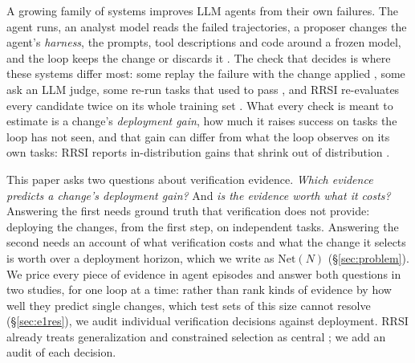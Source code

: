 \documentclass[11pt]{article}
\begin{document}
A growing family of systems improves LLM agents from their own failures. The agent runs, an analyst model reads the failed trajectories, a proposer changes the agent's \emph{harness}, the prompts, tool descriptions and code around a frozen model, and the loop keeps the change or discards it \citep{shinn2023reflexion,zhao2024expel,hu2025adas,zhang2025dgm,agrawal2025gepa,chen2026harnessfix,zhang2026ace,rrsi2026}. The check that decides is where these systems differ most: some replay the failure with the change applied \citep{ma2025dover,lin2026reflect,shah2026car}, some ask an LLM judge, some re-run tasks that used to pass \citep{chen2026harnessfix}, and RRSI re-evaluates every candidate twice on its whole training set \citep{rrsi2026}. What every check is meant to estimate is a change's \emph{deployment gain}, how much it raises success on tasks the loop has not seen, and that gain can differ from what the loop observes on its own tasks: RRSI reports in-distribution gains that shrink out of distribution \citep{rrsi2026}.

This paper asks two questions about verification evidence. \emph{Which evidence predicts a change's deployment gain?} And \emph{is the evidence worth what it costs?} Answering the first needs ground truth that verification does not provide: deploying the changes, from the first step, on independent tasks. Answering the second needs an account of what verification costs and what the change it selects is worth over a deployment horizon, which we write as $\mathrm{Net}(N)$ (\S\ref{sec:problem}). We price every piece of evidence in agent episodes and answer both questions in two studies, for one loop at a time: rather than rank kinds of evidence by how well they predict single changes, which test sets of this size cannot resolve (\S\ref{sec:e1res}), we audit individual verification decisions against deployment. RRSI already treats generalization and constrained selection as central \citep{rrsi2026}; we add an audit of each decision.
\end{document}
